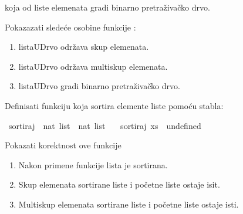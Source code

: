 \begin{isabellebody}
\begin{exercise}[subtitle=Binarno pretraživačko stablo.]
\begin{isamarkuptext}
      koja od liste elemenata gradi binarno pretraživačko drvo.%
\end{isamarkuptext}\isamarkuptrue%
%
\begin{isamarkuptext}%
Pokazazati sledeće osobine funkcije :%
\end{isamarkuptext}\isamarkuptrue%
%
\begin{enumerate}
  \item listaUDrvo održava skup elemenata.
  \item listaUDrvo održava multiskup elemenata.
  \item listaUDrvo gradi binarno pretraživačko drvo.
\end{enumerate}
%
\begin{isamarkuptext}%
Definisati funkciju koja sortira elemente liste pomoću stabla:%
\end{isamarkuptext}\isamarkuptrue%
\isamarkupfalse%
\ sortiraj\ {\isacharcolon}{\kern0pt}{\isacharcolon}{\kern0pt}\ {\isachardoublequoteopen}nat\ list\ {\isasymRightarrow}\ nat\ list{\isachardoublequoteclose}\ \isanewline
\ \ {\isachardoublequoteopen}sortiraj\ xs\ {\isacharequal}{\kern0pt}\ undefined{\isachardoublequoteclose}%
\begin{isamarkuptext}%
Pokazati korektnost ove funkcije%
\end{isamarkuptext}\isamarkuptrue%
%
\begin{enumerate}
  \item Nakon primene funkcije lista je sortirana.
  \item Skup elemenata sortirane liste i početne liste ostaje isit.
  \item Multiskup elemenata sortirane liste i početne liste ostaje isti.
\end{enumerate}
%
\end{exercise}
%
\isadelimtheory
%
\endisadelimtheory
%
\isatagtheory
%
\endisatagtheory
{\isafoldtheory}%
%
\isadelimtheory
%
\endisadelimtheory
%
\end{isabellebody}%
\endinput
